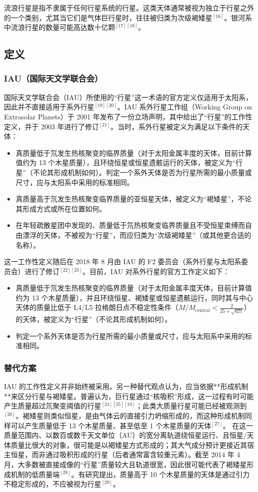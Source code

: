 流浪行星是指不隶属于任何行星系统的行星。这类天体通常被视为独立于行星之外的一个类别，尤其当它们是气体巨行星时，往往被归类为次级褐矮星$^{[16]}$。银河系中流浪行星的数量可能高达数十亿颗$^{[17][18]}$。
\subsection{定义}
\subsubsection{IAU（国际天文学联合会）}
国际天文学联合会（IAU）所使用的“行星”这一术语的官方定义仅适用于太阳系，因此并不直接适用于系外行星$^{[19][20]}$。IAU 系外行星工作组（Working Group on Extrasolar Planets）于 2001 年发布了一份立场声明，其中给出了“行星”的工作性定义，并于 2003 年进行了修订$^{[21]}$。当时，系外行星被定义为满足以下条件的天体：
\begin{itemize}
\item 真质量低于氘发生热核聚变的临界质量（对于太阳金属丰度的天体，目前计算值约为 13 个木星质量），且环绕恒星或恒星遗骸运行的天体，被定义为“行星”（不论其形成机制如何）。判定一个系外天体是否为行星所需的最小质量或尺寸，应与太阳系中采用的标准相同。
\item 真质量高于氘发生热核聚变临界质量的亚恒星天体，被定义为“褐矮星”，不论其形成方式或所在位置如何。
\item 在年轻疏散星团中发现的、质量低于氘热核聚变临界质量且不受恒星束缚而自由漂浮的天体，不被视为“行星”，而应归类为“次级褐矮星”（或其他更合适的名称）。
\end{itemize}
这一工作性定义随后在 2018 年 8 月由 IAU 的 F2 委员会（系外行星与太阳系委员会）进行了修订$^{[22][23]}$。目前，IAU 对系外行星的官方工作定义如下：
\begin{itemize}
\item 真质量低于氘发生热核聚变的临界质量（对于太阳金属丰度天体，目前计算值约为 13 个木星质量），并且环绕恒星、褐矮星或恒星遗骸运行，同时其与中心天体的质量比低于 L4/L5 拉格朗日点不稳定性条件（$M/M_{\text{central}} < \frac{2}{25+\sqrt{621}}$）的天体，被定义为“行星”（不论其形成机制如何）。
\item 判定一个系外天体是否为行星所需的最小质量或尺寸，应与太阳系中采用的标准相同。
\end{itemize}
\subsubsection{替代方案}
IAU 的工作性定义并非始终被采用。另一种替代观点认为，应当依据**形成机制**来区分行星与褐矮星。普遍认为，巨行星通过“核吸积”形成，这一过程有时可能产生质量超过氘聚变阈值的行星$^{[24][25][10]}$；此类大质量行星可能已经被观测到$^{[26]}$。褐矮星则类似恒星，是由气体云的直接引力坍缩形成的，而这种形成机制同样可以产生质量低于 13 个木星质量、甚至低至 1 个木星质量的天体$^{[27]}$。
在这一质量范围内、以数百或数千天文单位（AU）的宽分离轨道绕恒星运行、且恒星/天体质量比很大的对象，很可能是以褐矮星方式形成的；其大气成分预计更接近其宿主恒星，而非通过吸积形成的行星（后者通常富含较重元素）。截至 2014 年 4 月，大多数被直接成像的“行星”质量较大且轨道很宽，因此很可能代表了褐矮星形成机制的低质量端$^{[28]}$。有研究提出，质量高于 10 个木星质量的天体是通过引力不稳定形成的，不应被视为行星$^{[29]}$。

